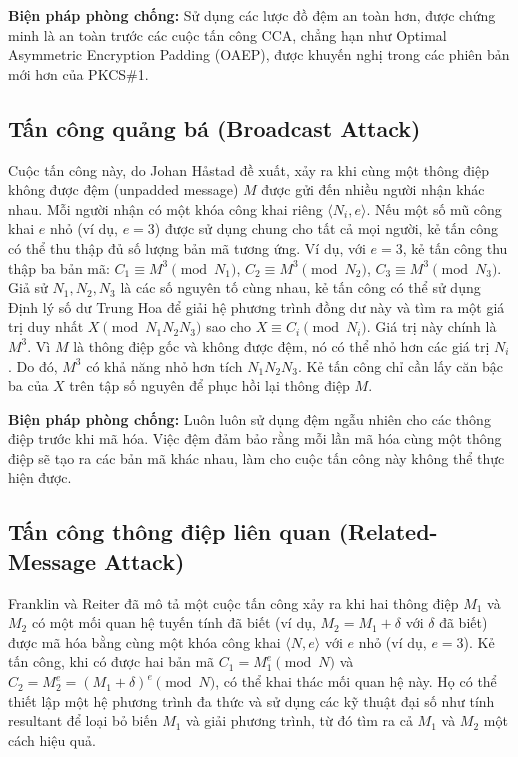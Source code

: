\documentclass[12pt, a4paper]{article}
\begin{document}
\textbf{Biện pháp phòng chống:} Sử dụng các lược đồ đệm an toàn hơn, được chứng minh là an toàn trước các cuộc tấn công CCA, chẳng hạn như Optimal Asymmetric Encryption Padding (OAEP), được khuyến nghị trong các phiên bản mới hơn của PKCS\#1.

\subsection{Tấn công quảng bá (Broadcast Attack)}
Cuộc tấn công này, do Johan Håstad đề xuất, xảy ra khi cùng một thông điệp không được đệm (unpadded message) $M$ được gửi đến nhiều người nhận khác nhau. Mỗi người nhận có một khóa công khai riêng $\langle N_i, e \rangle$. Nếu một số mũ công khai $e$ nhỏ (ví dụ, $e=3$) được sử dụng chung cho tất cả mọi người, kẻ tấn công có thể thu thập đủ số lượng bản mã tương ứng. Ví dụ, với $e=3$, kẻ tấn công thu thập ba bản mã: $C_1 \equiv M^3 \pmod{N_1}$, $C_2 \equiv M^3 \pmod{N_2}$, $C_3 \equiv M^3 \pmod{N_3}$. Giả sử $N_1, N_2, N_3$ là các số nguyên tố cùng nhau, kẻ tấn công có thể sử dụng Định lý số dư Trung Hoa để giải hệ phương trình đồng dư này và tìm ra một giá trị duy nhất $X \pmod{N_1 N_2 N_3}$ sao cho $X \equiv C_i \pmod{N_i}$. Giá trị này chính là $M^3$. Vì $M$ là thông điệp gốc và không được đệm, nó có thể nhỏ hơn các giá trị $N_i$. Do đó, $M^3$ có khả năng nhỏ hơn tích $N_1 N_2 N_3$. Kẻ tấn công chỉ cần lấy căn bậc ba của $X$ trên tập số nguyên để phục hồi lại thông điệp $M$.

\textbf{Biện pháp phòng chống:} Luôn luôn sử dụng đệm ngẫu nhiên cho các thông điệp trước khi mã hóa. Việc đệm đảm bảo rằng mỗi lần mã hóa cùng một thông điệp sẽ tạo ra các bản mã khác nhau, làm cho cuộc tấn công này không thể thực hiện được.

\subsection{Tấn công thông điệp liên quan (Related-Message Attack)}
Franklin và Reiter đã mô tả một cuộc tấn công xảy ra khi hai thông điệp $M_1$ và $M_2$ có một mối quan hệ tuyến tính đã biết (ví dụ, $M_2 = M_1 + \delta$ với $\delta$ đã biết) được mã hóa bằng cùng một khóa công khai $\langle N, e \rangle$ với $e$ nhỏ (ví dụ, $e=3$). Kẻ tấn công, khi có được hai bản mã $C_1 = M_1^e \pmod{N}$ và $C_2 = M_2^e = (M_1 + \delta)^e \pmod{N}$, có thể khai thác mối quan hệ này. Họ có thể thiết lập một hệ phương trình đa thức và sử dụng các kỹ thuật đại số như tính resultant để loại bỏ biến $M_1$ và giải phương trình, từ đó tìm ra cả $M_1$ và $M_2$ một cách hiệu quả.
\end{document}
